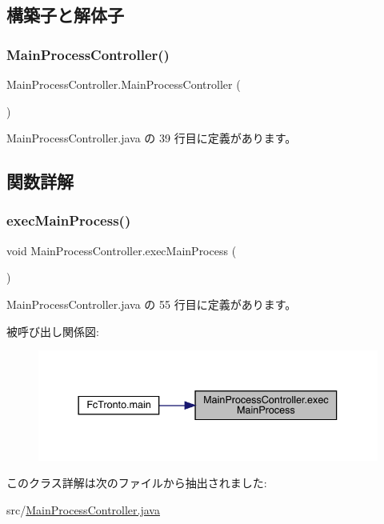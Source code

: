 \subsection{構築子と解体子}
\mbox{\label{class_main_process_controller_af422b069cc9f6cadb45a64ef985bd536}} 
\subsubsection{\texorpdfstring{MainProcessController()}{MainProcessController()}}
{\footnotesize\ttfamily Main\+Process\+Controller.\+Main\+Process\+Controller (\begin{DoxyParamCaption}{ }\end{DoxyParamCaption})\hspace{0.3cm}{\ttfamily [inline]}}



 Main\+Process\+Controller.\+java の 39 行目に定義があります。



\subsection{関数詳解}
\mbox{\label{class_main_process_controller_ac92bd6b23aa4c17913d6a9c63ee72739}} 
\subsubsection{\texorpdfstring{execMainProcess()}{execMainProcess()}}
{\footnotesize\ttfamily void Main\+Process\+Controller.\+exec\+Main\+Process (\begin{DoxyParamCaption}{ }\end{DoxyParamCaption})\hspace{0.3cm}{\ttfamily [inline]}}



 Main\+Process\+Controller.\+java の 55 行目に定義があります。

被呼び出し関係図\+:\nopagebreak
\begin{figure}[H]
\begin{center}
\leavevmode
\includegraphics[width=337pt]{d2/d71/class_main_process_controller_ac92bd6b23aa4c17913d6a9c63ee72739_icgraph}
\end{center}
\end{figure}


このクラス詳解は次のファイルから抽出されました\+:\begin{DoxyCompactItemize}
\item 
src/\mbox{\hyperlink{_main_process_controller_8java}{Main\+Process\+Controller.\+java}}\end{DoxyCompactItemize}
